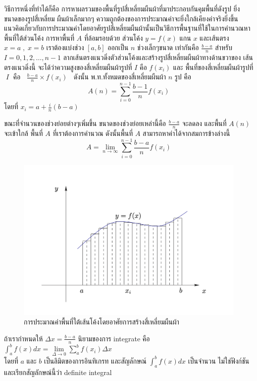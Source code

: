 \documentclass[
]{book}
\theoremstyle{definition}
\theoremstyle{definition}
\theoremstyle{definition}
\theoremstyle{definition}
\theoremstyle{remark}
\begin{document}
วิธีการหนึ่งที่ทำได้ก็คือ การหาผลรวมของพื้นที่รูปสี่เหลี่ยมผืนผ้าที่มาประกอบกันคุมพื้นที่ดังรูป
ยิ่งขนาดของรูปสี่เหลี่ยม ผืนผ้าเล็กมากๆ
ความถูกต้องของการประมาณค่าจะยิ่งใกล้เคียงค่าจริงยิ่งขึ้น
แนวคิดเกี่ยวกับการประมาณค่าโดยอาศัยรูปสี่เหลี่ยมผืนผ้านั้นเป็นวิธีการพื้นฐานที่ใช้ในการคำนวณหาพื้นที่ใต้ส่วนโค้ง
การหาพื้นที่ \(A\) ที่ล้อมรอบด้วย ส่วนโค้ง \(y=f(x)\) แกน \(x\) และเส้นตรง \(x=a\;,\;x=b\)
เราต้องแบ่งช่วง \([a,b]\) ออกเป็น \(n\) ช่วงเล็กๆขนาด เท่ากันคือ \(\frac{b-a}{n}\)
สำหรับ \(I=0,1,2,…,n-1\)
ลากเส้นตรงแนวดิ่งตัวส่วนโค้งและสร้างรูปสี่เหลี่ยมผืนผ้าทางด้านขวาของ เส้นตรงแนวดิ่งนี้
จะได้ว่าความสูงของสี่เหลี่ยมผืนผ้ารูปที่ \(I\) คือ \(f(x_i)\) และ พื้นที่ของสี่เหลี่ยมผืนผ้ารูปที่
\(\;I\;\) คือ \(\;\;\frac{b-a}{n}\times f(x_i)\;\;\) ดังนั้น
พ.ท.ทั้งหมดของสี่เหลี่ยมผืนผ้า \(n\) รูป คือ
\[A(n)= \sum_{i=0}^{n-1}\frac{b-1}{n}f(x_i)\] โดยที่
\(x_i = a + \frac{i}{n}(b-a)\)

ขณะที่จำนวนของช่วงย่อยต่างๆเพิ่มขึ้น ขนาดของช่วงย่อยเหล่านี้คือ \(\frac{b-a}{n}\) จะลดลง
และพื้นที่ \(A(n)\) จะเข้าใกล้ พื้นที่ \(A\) ที่เราต้องการคำนวณ ดังนั้นพื้นที่ \(A\)
สามารถหาค่าได้จากสมการข้างล่างนี้
\[A= \lim\limits_{n\rightarrow\infty}\sum_{i=0}^{n-1}\frac{b-a}{n}f(x_i)\]

\begin{figure}
\includegraphics[width=1\linewidth]{images/fig-area-2} \caption{การประมาณค่าพื้นที่ใต้เส้นโค้งโดยอาศัยการสร้างสี่เหลี่ยมผืนผ้า}\label{fig:fig-area-2}
\end{figure}

ถ้าเรากำหนดให้ \(\Delta x=\frac{b-a}{n}\) นิยามของการ integrate คือ
\(\int^b_af(x)dx=
\lim\limits_{\Delta\rightarrow 0}\sum_a^bf(x_i)\Delta x\)\\
โดยที่ \(a\) และ \(b\) เป็นลิมิตของการอินทิเกรท และสัญลักษณ์ \(\int^b_af(x)dx\) เป็นจำนวน
ไม่ใช่ฟังก์ชัน และเรียกสัญลักษณ์นี้ว่า definite integral
\end{document}
